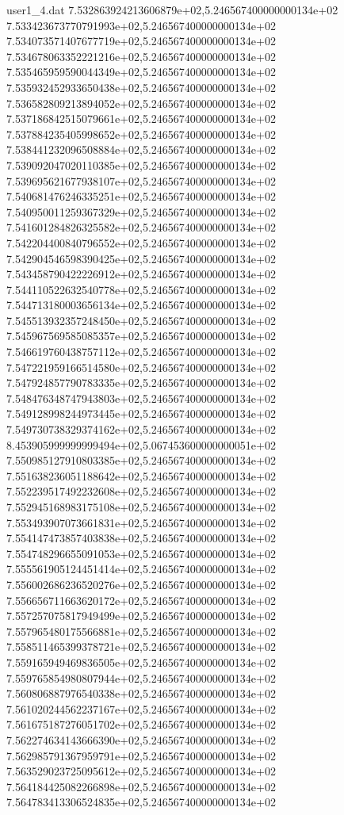 \begin{filecontents}{user1_4.dat}
7.532863924213606879e+02,5.246567400000000134e+02
7.533423673770791993e+02,5.246567400000000134e+02
7.534073571407677719e+02,5.246567400000000134e+02
7.534678063352221216e+02,5.246567400000000134e+02
7.535465959590044349e+02,5.246567400000000134e+02
7.535932452933650438e+02,5.246567400000000134e+02
7.536582809213894052e+02,5.246567400000000134e+02
7.537186842515079661e+02,5.246567400000000134e+02
7.537884235405998652e+02,5.246567400000000134e+02
7.538441232096508884e+02,5.246567400000000134e+02
7.539092047020110385e+02,5.246567400000000134e+02
7.539695621677938107e+02,5.246567400000000134e+02
7.540681476246335251e+02,5.246567400000000134e+02
7.540950011259367329e+02,5.246567400000000134e+02
7.541601284826325582e+02,5.246567400000000134e+02
7.542204400840796552e+02,5.246567400000000134e+02
7.542904546598390425e+02,5.246567400000000134e+02
7.543458790422226912e+02,5.246567400000000134e+02
7.544110522632540778e+02,5.246567400000000134e+02
7.544713180003656134e+02,5.246567400000000134e+02
7.545513932357248450e+02,5.246567400000000134e+02
7.545967569585085357e+02,5.246567400000000134e+02
7.546619760438757112e+02,5.246567400000000134e+02
7.547221959166514580e+02,5.246567400000000134e+02
7.547924857790783335e+02,5.246567400000000134e+02
7.548476348747943803e+02,5.246567400000000134e+02
7.549128998244973445e+02,5.246567400000000134e+02
7.549730738329374162e+02,5.246567400000000134e+02
8.453905999999999494e+02,5.067453600000000051e+02
7.550985127910803385e+02,5.246567400000000134e+02
7.551638236051188642e+02,5.246567400000000134e+02
7.552239517492232608e+02,5.246567400000000134e+02
7.552945168983175108e+02,5.246567400000000134e+02
7.553493907073661831e+02,5.246567400000000134e+02
7.554147473857403838e+02,5.246567400000000134e+02
7.554748296655091053e+02,5.246567400000000134e+02
7.555561905124451414e+02,5.246567400000000134e+02
7.556002686236520276e+02,5.246567400000000134e+02
7.556656711663620172e+02,5.246567400000000134e+02
7.557257075817949499e+02,5.246567400000000134e+02
7.557965480175566881e+02,5.246567400000000134e+02
7.558511465399378721e+02,5.246567400000000134e+02
7.559165949469836505e+02,5.246567400000000134e+02
7.559765854980807944e+02,5.246567400000000134e+02
7.560806887976540338e+02,5.246567400000000134e+02
7.561020244562237167e+02,5.246567400000000134e+02
7.561675187276051702e+02,5.246567400000000134e+02
7.562274634143666390e+02,5.246567400000000134e+02
7.562985791367959791e+02,5.246567400000000134e+02
7.563529023725095612e+02,5.246567400000000134e+02
7.564184425082266898e+02,5.246567400000000134e+02
7.564783413306524835e+02,5.246567400000000134e+02

\end{filecontents}
